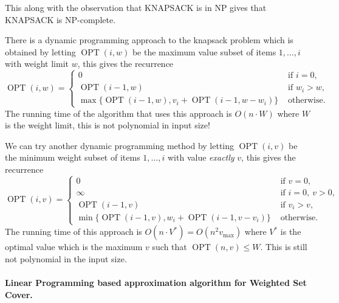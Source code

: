 \documentclass[11pt,a4paper]{article}
\theoremstyle{definition}
\DeclareMathOperator{\OPT}{OPT}
\begin{document}
This along with the observation that KNAPSACK is in NP gives that KNAPSACK is NP-complete.

There is a dynamic programming approach to the knapsack problem which is obtained by letting $\OPT(i,w)$ be the maximum value subset of items $1,\ldots,i$ with weight limit $w$, this gives the recurrence
\[
\OPT(i,w) =\begin{cases}
0 &\text{ if } i = 0,\\
\OPT(i-1,w)&\text{ if } w_i> w,\\
\max\{\OPT(i-1,w), v_i +\OPT(i-1, w - w_i)\} &\text{ otherwise}.
\end{cases} 
\]
The running time of the algorithm that uses this approach is $O(n\cdot W)$ where $W$ is the weight limit, this is not polynomial in input size!

We can try another dynamic programming method by letting $\OPT(i,v)$ be the minimum weight subset of items $1,\ldots,i$ with value \emph{exactly} $v$, this gives the recurrence
\[
\OPT(i,v) = \begin{cases}
0 &\text{ if } v = 0,\\
\infty &\text{ if } i = 0,\ v > 0, \\
\OPT(i-1,v)&\text{ if } v_i> v,\\
\min\{\OPT(i-1,v), w_i +\OPT(i-1, v - v_i)\} &\text{ otherwise}.
\end{cases} 
\]
The running time of this approach is $O(n\cdot V^*) = O(n^2 v_{\text{max}})$ where $V^*$ is the optimal value which is the maximum $v$ such that $\OPT(n,v) \le W$.
This is still not polynomial in the input size.

\paragraph{Linear Programming based approximation algorithm for Weighted Set Cover.}
\end{document}
